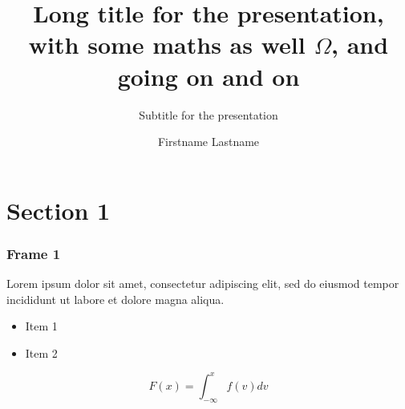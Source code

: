 \documentclass[]{beamer}
\title[Short title]{Long title for the presentation, with some maths as well $\Omega$, and going on and on}
\subtitle{Subtitle for the presentation}
\author{Firstname Lastname}
\date{}
\begin{document}
\begin{frame}
\titlepage
\setcounter{framenumber}{0}
\end{frame}




\section{Section 1}


\begin{frame}
\frametitle{Frame 1}


Lorem ipsum dolor sit amet, consectetur adipiscing elit, sed do eiusmod tempor incididunt ut labore et dolore magna aliqua. 

\begin{itemize}
	\item Item 1
	\item Item 2
\end{itemize}

\[F(x) = \int_{-\infty}^x f(v)dv \]

\end{frame}
\end{document}
